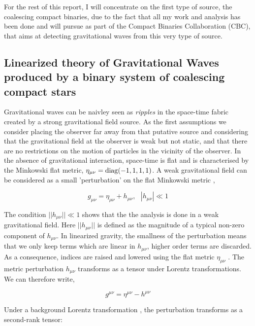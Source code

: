 \documentclass[epsf]{article}
\begin{document}
For the rest of this report, I will concentrate on the first type of source, the coalescing compact binaries, due to the fact that all my work and analysis has been done and will pursue as part of the Compact Binaries Collaboration (CBC), that aims at detecting gravitational waves from this very type of source.



\subsection{Linearized theory of Gravitational Waves produced by a binary system of coalescing compact stars}

Gravitational waves can be naivley seen as {\it ripples} in the
 space-time fabric created by a strong gravitational field source. 
As the first assumptions we consider placing the observer far away from that putative source and 
considering that the gravitational field at the observer is weak but not static,
and that there are no restrictions on the motion of particles in the vicinity of
 the observer. In the absence of gravitational interaction, space-time is flat and
is characterised by the Minkowski flat metric, $\eta_{\mu\nu}={\rm diag}(-1,1,1,1)$. A weak 
gravitational field can be considered as a small 'perturbation' on the
flat Minkowski metric \cite{schutz,maggiore,chaky},

\begin{equation}
\boxed{g_{\mu\nu} = \eta_{\mu\nu} + h_{\mu\nu}, ~~~|h_{\mu\nu}| \ll 1}
\end{equation}

The condition $||h_{\mu\nu}|| \ll 1$ shows that the the analysis is done in a weak gravitational field. Here $||h_{\mu\nu}||$ is defined as the magnitude of a typical non-zero component of $h_{\mu\nu}$. In linearized gravity, the smallness of the perturbation means that
we only keep terms which are linear in $h_{\mu\nu}$, higher order terms are discarded. As
a consequence, indices are raised and lowered using the flat metric $\eta_{\mu\nu}$ . The metric
perturbation $h_{\mu\nu}$ transforms as a tensor under Lorentz transformations. We can therefore write,

\begin{equation}
g^{\mu\nu} = \eta^{\mu\nu} - h^{\mu\nu}
\end{equation}

Under a background Lorentz transformation \cite{schutz}, the perturbation 
transforms as a second-rank tensor:
\end{document}
